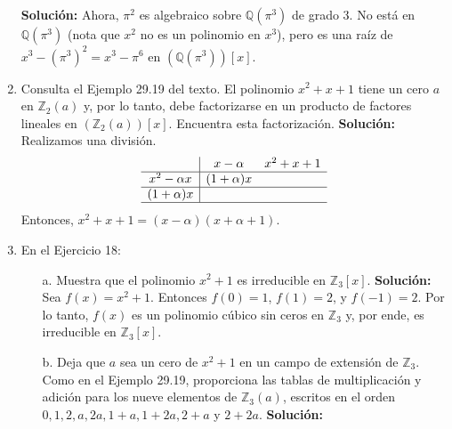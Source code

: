 \begin{enumerate}
    \textbf{Solución:}
    Ahora, $\pi^2$ es algebraico sobre $\mathbb{Q}(\pi^3)$ de grado 3. No está en $\mathbb{Q}(\pi^3)$ (nota que $x^2$ no es un polinomio en $x^3$), pero es una raíz de $x^3 - (\pi^3)^2 = x^3 - \pi^6$ en $\left(\mathbb{Q}(\pi^3)\right)[x]$.
    \item Consulta el Ejemplo 29.19 del texto. El polinomio $x^2 + x + 1$ tiene un cero $a$ en $\mathbb{Z}_2(a)$ y, por lo tanto, debe factorizarse en un producto de factores lineales en $(\mathbb{Z}_2(a))[x]$. Encuentra esta factorización.
    \textbf{Solución:}
    Realizamos una división.
    \[
    \begin{array}{c|cc}
        & x - \alpha & x^2 + x + 1 \\
    \hline
    x^2 - \alpha x & (1 + \alpha)x & \\
    \hline
    (1 + \alpha)x & & \\
    \hline
    \end{array} 
    \]
    Entonces, $x^2 + x + 1 = (x - \alpha)(x + \alpha + 1)$.
    \item En el Ejercicio 18:
    \begin{enumerate}
        \item[a.] Muestra que el polinomio $x^2 + 1$ es irreducible en $\mathbb{Z}_3[x]$.
        \textbf{Solución:}
        Sea $f(x) = x^2 + 1$. Entonces $f(0) = 1$, $f(1) = 2$, y $f(-1) = 2$. Por lo tanto, $f(x)$ es un polinomio cúbico sin ceros en $\mathbb{Z}_3$ y, por ende, es irreducible en $\mathbb{Z}_3[x]$.
        \item[b.] Deja que $a$ sea un cero de $x^2 + 1$ en un campo de extensión de $\mathbb{Z}_3$. Como en el Ejemplo 29.19, proporciona las tablas de multiplicación y adición para los nueve elementos de $\mathbb{Z}_3(a)$, escritos en el orden $0, 1, 2, a, 2a, 1 + a, 1 + 2a, 2 + a$ y $2 + 2a$.
        \textbf{Solución:}
        

\end{enumerate}
\end{enumerate}
